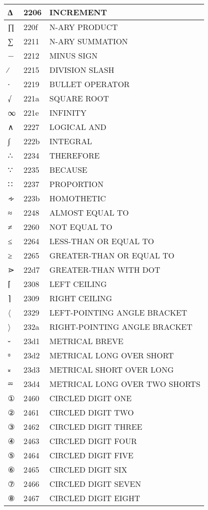 \documentclass[12pt,letterpaper,openany]{book}
\begin{document}
\begin{center}
\begin{supertabular}{|m{0.25in}|m{0.5in}|m{4in}|}
∆ & 2206 & INCREMENT\\\hline
∏ & 220f & N-ARY PRODUCT\\\hline
∑ & 2211 & N-ARY SUMMATION\\\hline
− & 2212 & MINUS SIGN\\\hline
∕ & 2215 & DIVISION SLASH\\\hline
∙ & 2219 & BULLET OPERATOR\\\hline
√ & 221a & SQUARE ROOT\\\hline
∞ & 221e & INFINITY\\\hline
∧ & 2227 & LOGICAL AND\\\hline
∫ & 222b & INTEGRAL\\\hline
∴ & 2234 & THEREFORE\\\hline
∵ & 2235 & BECAUSE\\\hline
∷ & 2237 & PROPORTION\\\hline
∻ & 223b & HOMOTHETIC\\\hline
≈ & 2248 & ALMOST EQUAL TO\\\hline
≠ & 2260 & NOT EQUAL TO\\\hline
≤ & 2264 & LESS-THAN OR EQUAL TO\\\hline
≥ & 2265 & GREATER-THAN OR EQUAL TO\\\hline
⋗ & 22d7 & GREATER-THAN WITH DOT\\\hline
⌈ & 2308 & LEFT CEILING\\\hline
⌉ & 2309 & RIGHT CEILING\\\hline
〈 & 2329 & LEFT-POINTING ANGLE BRACKET\\\hline
〉 & 232a & RIGHT-POINTING ANGLE BRACKET\\\hline
⏑ & 23d1 & METRICAL BREVE\\\hline
⏒ & 23d2 & METRICAL LONG OVER SHORT\\\hline
⏓ & 23d3 & METRICAL SHORT OVER LONG\\\hline
⏔ & 23d4 & METRICAL LONG OVER TWO SHORTS\\\hline
① & 2460 & CIRCLED DIGIT ONE\\\hline
② & 2461 & CIRCLED DIGIT TWO\\\hline
③ & 2462 & CIRCLED DIGIT THREE\\\hline
④ & 2463 & CIRCLED DIGIT FOUR\\\hline
⑤ & 2464 & CIRCLED DIGIT FIVE\\\hline
⑥ & 2465 & CIRCLED DIGIT SIX\\\hline
⑦ & 2466 & CIRCLED DIGIT SEVEN\\\hline
⑧ & 2467 & CIRCLED DIGIT EIGHT\\\hline

\end{supertabular}
\end{center}
\end{document}
